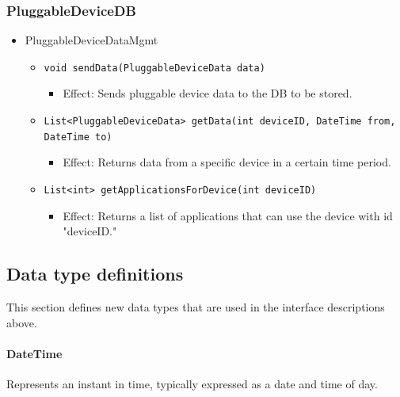     \subsubsection{PluggableDeviceDB}
        \begin{itemize}
            \item PluggableDeviceDataMgmt
            \begin{itemize}
                \item \texttt{void sendData(PluggableDeviceData data)}
                \begin{itemize}
                    \item Effect: Sends pluggable device data to the DB to be stored.
                \end{itemize}
                \item \texttt{List<PluggableDeviceData> getData(int deviceID, DateTime from, DateTime to)}
                \begin{itemize}
                    \item Effect: Returns data from a specific device in a certain time period.
                \end{itemize}
                \item \texttt{List<int> getApplicationsForDevice(int deviceID)}
                \begin{itemize}
                    \item Effect: Returns a list of applications that can use the device with id "deviceID."
                \end{itemize}
            \end{itemize}
        \end{itemize}


\subsection{Data type definitions}
    This section defines new data types that are used in the interface descriptions above.

    \paragraph{DateTime} Represents an instant in time, typically expressed as a date and time of day.


